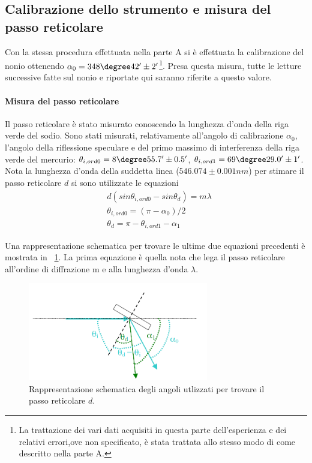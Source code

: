\documentclass[a4paper,10pt]{article}
\begin{document}
{{{{{{\subsection{Calibrazione dello strumento e misura del passo reticolare}
Con la stessa procedura effettuata nella parte A si è effettuata la calibrazione del nonio ottenendo $\alpha_0 = 348\degree 42' \pm  2' $\footnote{La trattazione dei vari dati acquisiti in questa parte dell'esperienza e dei relativi errori,ove non specificato, è stata trattata allo stesso modo di come descritto nella parte A.}. Presa questa misura, tutte le letture successive fatte sul nonio e riportate qui saranno riferite a questo valore.


\paragraph{Misura del passo reticolare}
Il passo reticolare è stato misurato conoscendo la lunghezza d'onda della riga verde del sodio. Sono stati misurati, relativamente all'angolo di calibrazione $\alpha_0$, l'angolo della riflessione speculare e del primo massimo di interferenza della riga verde del mercurio: $\theta_{i,ord0} = 8\degree 55.7' \pm 0.5'$, $\theta_{i,ord1} = 69\degree 29.0'\pm 1'$. Nota la lunghezza d'onda della suddetta linea ($546.074 \pm 0.001 nm$) per stimare il passo reticolare $d$ si sono utilizzate le equazioni
\begin{align*}
&d(sin \theta_{i,ord0} - sin \theta_d) = m\lambda\\
&\theta_{i,ord0} = (\pi - \alpha_0)/2\\
&\theta_d = \pi - \theta_{i,ord1} - \alpha_1
\end{align*}

Una rappresentazione schematica per trovare le ultime due equazioni precedenti è mostrata in \figurename{~\ref{fig:angoli}}. La prima equazione è quella nota che lega il passo reticolare all'ordine di diffrazione m e alla lunghezza d'onda $\lambda$.


\begin{figure}[H]
	\centering
	\includegraphics[width=0.7\textwidth]{../grafici/Angoli.png}
	\caption{Rappresentazione schematica degli angoli utlizzati per trovare il passo reticolare $d$.}
	\label{fig:angoli}
\end{figure}

}}}}}}
\end{document}
